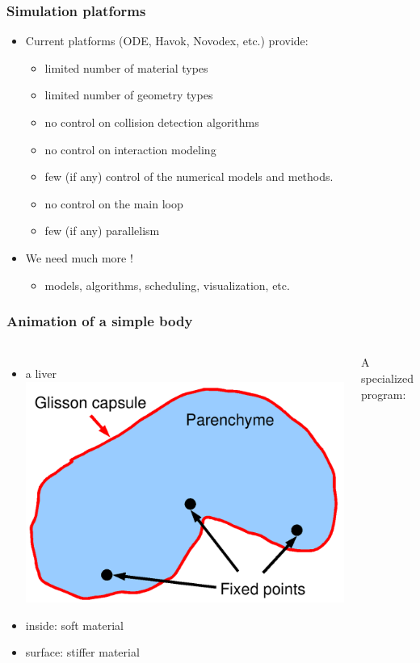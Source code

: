 \documentclass[a4paper,compress]{beamer}
\begin{document}
\begin{frame}
\frametitle{Simulation platforms}
\begin{itemize}
\item Current platforms (ODE, Havok, Novodex, etc.) provide:
\begin{itemize}
\item limited number of material types
\item limited number of geometry types
\item no control on collision detection algorithms
\item no control on interaction modeling
\item few (if any) control of the numerical models and methods.
\item no control on the main loop
\item few (if any) parallelism
\end{itemize}
\item We need much more !
\begin{itemize}
 \item models, algorithms, scheduling, visualization, etc.
\end{itemize}

\end{itemize}
\end{frame}


\begin{frame}[fragile]
\frametitle{Animation of a simple body}
\begin{columns}

\begin{itemize}
\item a liver
\includegraphics[width=\linewidth]{liver_2ForceFields.png}
\item inside: soft material
\item surface: stiffer material
\end{itemize}

A specialized program:
\lstset{basicstyle=\large}

\end{columns}

\end{frame}
\end{document}
